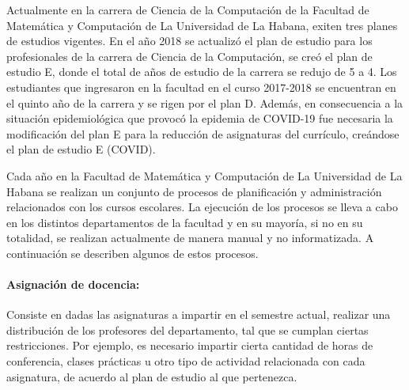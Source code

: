 





Actualmente en la carrera de Ciencia de la 
Computación de la Facultad de Matemática 
y Computación de La Universidad de La Habana, exiten tres planes de estudios 
vigentes. En el año 2018 se actualizó el plan de estudio para los profesionales de la 
carrera de Ciencia de la Computación, se creó el plan de estudio E, donde el total de años 
de estudio de la carrera se redujo de 5 a 4. Los estudiantes que ingresaron en la facultad en 
el curso 2017-2018 se encuentran en el quinto año de la carrera y se rigen por el plan D. 
Además, en consecuencia a la situación epidemiológica que provocó la epidemia de COVID-19 
fue necesaria la modificación del plan E para la reducción de asignaturas del currículo, creándose 
el plan de estudio E (COVID).   




Cada año en la Facultad de Matemática y Computación de La 
Universidad de La Habana se realizan un conjunto de procesos de 
planificación y administración relacionados con los cursos escolares.
La ejecución de los procesos se lleva a cabo en los distintos
departamentos de la facultad y en su mayoría, si no en su totalidad,
se realizan actualmente de manera manual y no informatizada.
A continuación se describen algunos de estos procesos.

\paragraph{Asignación de docencia:}
Consiste en dadas las asignaturas a impartir en el semestre actual,
realizar una distribución de los profesores del departamento, tal que se 
cumplan ciertas restricciones. Por ejemplo, es necesario impartir
cierta cantidad de horas de conferencia, clases prácticas u otro tipo de actividad 
relacionada con cada asignatura, de acuerdo al plan de estudio al que pertenezca.

